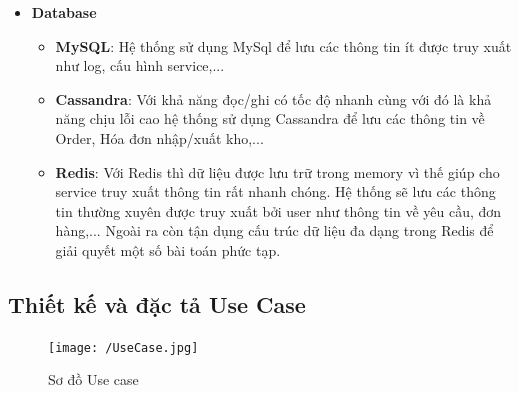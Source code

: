 \begin{itemize}
				\item \textbf{Database}
				\begin{itemize}
					\item \textbf{MySQL}: Hệ thống sử dụng MySql để lưu các thông tin ít được truy xuất như log, cấu hình service,...
					\item \textbf{Cassandra}: Với khả năng đọc/ghi có tốc độ nhanh cùng với đó là khả năng chịu lỗi cao hệ thống sử dụng Cassandra để lưu các thông tin về Order, Hóa đơn nhập/xuất kho,...
					\item \textbf{Redis}: Với Redis thì dữ liệu được lưu trữ trong memory vì thế giúp cho service truy xuất thông tin rất nhanh chóng. Hệ thống sẽ lưu các thông tin thường xuyên được truy xuất bởi user như thông tin về yêu cầu, đơn hàng,... Ngoài ra còn tận dụng cấu trúc dữ liệu đa dạng trong Redis để giải quyết một số bài toán phức tạp. 
				\end{itemize}
		
		\end{itemize}

\newpage
\subsection{Thiết kế và đặc tả Use Case}

\begin{figure}[!ht]
	\texttt{[image: /UseCase.jpg]}
	\centering
	\linebreak
	\caption{Sơ đồ Use case}
\end{figure}

	\newpage
	
